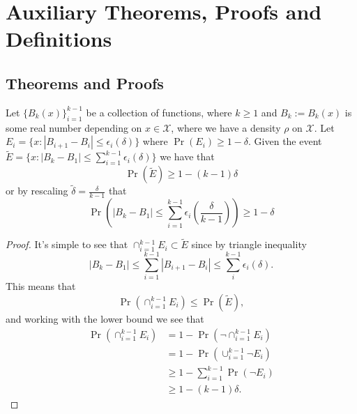 \chapter{Auxiliary Theorems, Proofs and Definitions}
\label{sec:appendix-proofs}

\section{Theorems and Proofs}

\begin{lemma}
  \label{lem:combining_slt_bounds}
  Let \(\{B_k(x)\}_{i=1}^{k-1}\) be a collection of functions, where \(k \geq 1\) and \(B_k := B_k(x)\) is
  some real number depending on \(x \in \mathcal{X}\), where we have a density
  \(\rho\) on \(\mathcal{X}\). Let \(E_i = \{x : |B_{i+1} - B_{i}| \leq
  \epsilon_i(\delta)\}\) where \(\Pr(E_i) \geq 1 - \delta\). Given the event
  \(\tilde{E} = \{x : |B_{k} - B_{1}| \leq \sum_{i=1}^{k-1}\epsilon_i(\delta)\}\) we
  have that
  \begin{equation*}
    \Pr(\tilde{E}) \geq 1 - (k-1) \delta
  \end{equation*}
  or by rescaling \(\tilde{\delta} = \frac{\delta}{k-1}\) that
  \begin{equation}
    \Pr(|B_{k} - B_1| \leq \sum_{i=1}^{k-1}\epsilon_i(\frac{\delta}{k-1})) \geq 1 - \delta
  \end{equation}
\end{lemma}
\begin{proof}
  It's simple to see that \(\cap_{i=1}^{k-1}E_i \subset \tilde{E}\) since by
  triangle inequality
  \begin{equation*}
    |B_{k} - B_1| \leq \sum_{i=1}^{k-1}|B_{i+1} - B_i| \leq \sum_i^{k-1} \epsilon_i(\delta).
  \end{equation*}
  This means that
  \begin{equation*}
    \Pr(\cap_{i=1}^{k-1}E_i) \leq \Pr(\tilde{E}),
  \end{equation*}
  and working with the lower bound we see that
  \begin{align*}
    \Pr(\cap_{i=1}^{k-1}E_i) & = 1 - \Pr(\neg \cap_{i=1}^{k-1}E_i) \\
                                    & = 1 - \Pr(\cup_{i=1}^{k-1} \neg E_i) \\
                                    & \geq 1 - \sum_{i=1}^{k-1} \Pr(\neg E_i) \\
                                    & \geq 1 - (k-1)\delta.
  \end{align*}
\end{proof}

